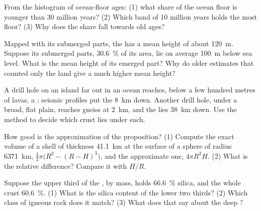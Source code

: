 \begin{exercise}[$\star\star$]\label{exo:g12:continental-crust:9}
From the histogram of ocean-floor ages: (1) what share of the ocean floor is
younger than 30 million years? (2) Which band of 10 million years holds the
most floor? (3) Why does the share fall towards old ages?
\end{exercise}

\begin{exercise}[$\star\star$]\label{exo:g12:continental-crust:10}
Mapped with its submerged parts, the  has a mean height of
about \qty{120}{m}. Suppose its submerged parts, \qty{30.6}{\percent} of its
area, lie on average \qty{100}{m} below sea level. What is the mean height of
its emerged part? Why do older estimates that counted only the land give a
much higher mean height?
\end{exercise}

\begin{exercise}[$\star\star$]\label{exo:g12:continental-crust:11}
A drill hole on an island far out in an ocean reaches, below a few hundred
metres of lavas, a ; seismic profiles put the  \qty{8}{km} down.
Another drill hole, under a broad, flat plain, reaches gneiss at \qty{2}{km},
and the  lies \qty{38}{km} down. Use the method to decide which crust
lies under each.
\end{exercise}

\begin{exercise}[$\star\star\star$]\label{exo:g12:continental-crust:12}
How good is the approximation of the proposition? (1) Compute the exact
volume of a shell of thickness \qty{41.1}{km} at the surface of a sphere of
radius \qty{6371}{km}, $\tfrac{4}{3}\pi\bigl(R^3 - (R - H)^3\bigr)$, and the
approximate one, $4\pi R^2 H$. (2) What is the relative difference? Compare
it with $H/R$.
\end{exercise}

\begin{exercise}[$\star\star\star$]\label{exo:g12:continental-crust:13}
Suppose the upper third of the , by mass, holds
\qty{66.6}{\percent} silica, and the whole crust \qty{60.6}{\percent}. (1)
What is the silica content of the lower two thirds? (2) Which class of
igneous rock does it match? (3) What does that say about the deep
?
\end{exercise}

